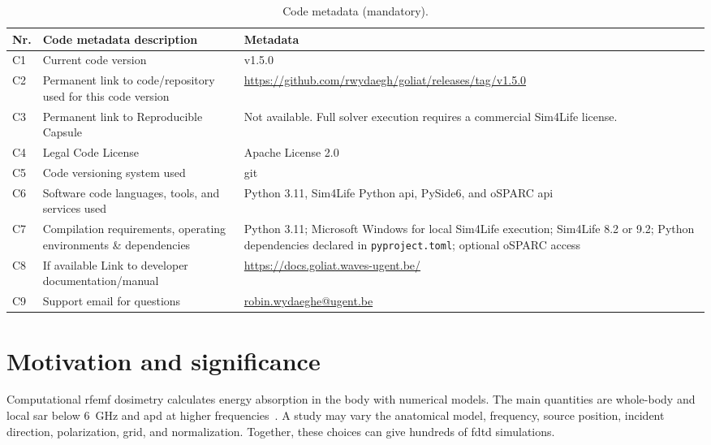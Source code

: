 \documentclass[final,5p,times,twocolumn]{elsarticle}
\begin{document}
\begin{table}[!ht]
\centering
\small
\begin{tabularx}{\textwidth}{|l|>{\raggedright\arraybackslash}p{}|>{\raggedright\arraybackslash}X|}
\hline
\textbf{Nr.} & \textbf{Code metadata description} & \textbf{Metadata} \\
\hline
C1 & Current code version & v1.5.0 \\
\hline
C2 & Permanent link to code/repository used for this code version & \url{https://github.com/rwydaegh/goliat/releases/tag/v1.5.0} \\
\hline
C3 & Permanent link to Reproducible Capsule & Not available. Full solver execution requires a commercial Sim4Life license. \\
\hline
C4 & Legal Code License & Apache License 2.0 \\
\hline
C5 & Code versioning system used & git \\
\hline
C6 & Software code languages, tools, and services used & Python 3.11, Sim4Life Python \gls{api}, PySide6, and oSPARC \gls{api} \\
\hline
C7 & Compilation requirements, operating environments \& dependencies & Python 3.11; Microsoft Windows for local Sim4Life execution; Sim4Life 8.2 or 9.2; Python dependencies declared in \texttt{pyproject.toml}; optional oSPARC access \\
\hline
C8 & If available Link to developer documentation/manual & \url{https://docs.goliat.waves-ugent.be/} \\
\hline
C9 & Support email for questions & \url{robin.wydaeghe@ugent.be} \\
\hline
\end{tabularx}
\caption{Code metadata (mandatory).}
\label{codeMetadata}
\end{table}

\glsresetall

\section{Motivation and significance}

Computational \gls{rfemf} dosimetry calculates energy absorption in the body with numerical models. The main quantities are whole-body and local \gls{sar} below 6~GHz and \gls{apd} at higher frequencies~\cite{Hand2008,Hirata2021}. A study may vary the anatomical model, frequency, source position, incident direction, polarization, grid, and normalization. Together, these choices can give hundreds of \gls{fdtd} simulations.
\end{document}

